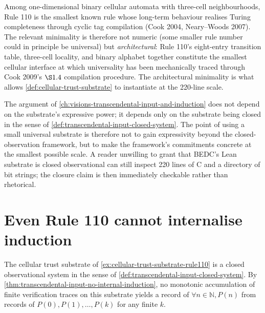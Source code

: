 \begin{principle}
\label{prin:rule110-minimal-universal}
Among one-dimensional binary cellular automata with three-cell neighbourhoods, Rule 110 is the smallest known rule whose long-term behaviour realises Turing completeness through cyclic tag compilation (Cook 2004, Neary--Woods 2007). The relevant minimality is therefore not numeric (some smaller rule number could in principle be universal) but \emph{architectural}: Rule 110's eight-entry transition table, three-cell locality, and binary alphabet together constitute the smallest cellular interface at which universality has been mechanically traced through Cook 2009's \(\S 1.4\) compilation procedure. The architectural minimality is what allows \autoref{def:cellular-trust-substrate} to instantiate at the 220-line scale.
\end{principle}

\begin{remark}
\label{rem:rule110-minimality-matters}
The argument of \autoref{ch:visions-transcendental-input-and-induction} does not depend on the substrate's expressive power; it depends only on the substrate being closed in the sense of \autoref{def:transcendental-input-closed-system}. The point of using a small universal substrate is therefore not to gain expressivity beyond the closed-observation framework, but to make the framework's commitments concrete at the smallest possible scale. A reader unwilling to grant that BEDC's Lean substrate is closed observational can still inspect 220 lines of C and a directory of bit strings; the closure claim is then immediately checkable rather than rhetorical.
\end{remark}

\section{Even Rule 110 cannot internalise induction}
\label{sec:cellular-automaton-reading-rule110-cannot-induct}

\begin{theorem}
\label{thm:rule110-no-internal-induction}
The cellular trust substrate of \autoref{ex:cellular-trust-substrate-rule110} is a closed observational system in the sense of \autoref{def:transcendental-input-closed-system}. By \autoref{thm:transcendental-input-no-internal-induction}, no monotonic accumulation of finite verification traces on this substrate yields a record of $\forall n \in \mathbb{N}, P(n)$ from records of $P(0), P(1), \ldots, P(k)$ for any finite $k$.
\end{theorem}

